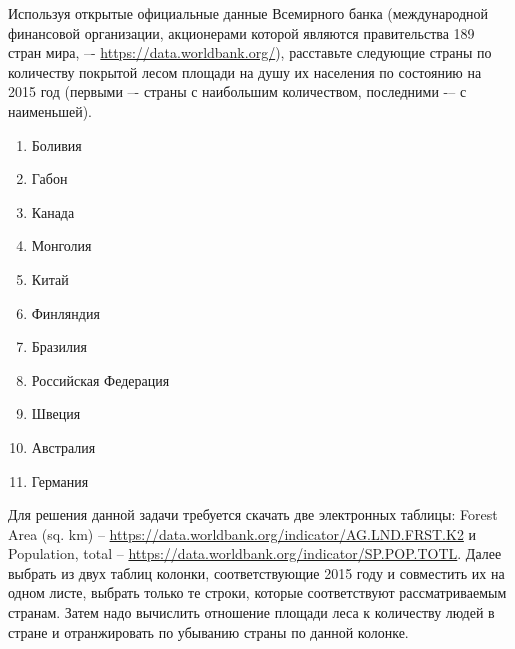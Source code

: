 
Используя открытые официальные данные Всемирного банка (международной финансовой организации, акционерами которой являются правительства 189 стран мира, –- \url{https://data.worldbank.org/}), расставьте следующие страны по количеству покрытой лесом площади на душу их населения по состоянию на 2015 год (первыми –- страны с наибольшим количеством, последними -– с наименьшей).

\begin{enumerate}
    \item Боливия
    \item Габон
    \item Канада
    \item Монголия
    \item Китай
    \item Финляндия
    \item Бразилия
    \item Российская Федерация
    \item Швеция
    \item Австралия
    \item Германия
\end{enumerate}

\solutionSection
Для решения данной задачи требуется скачать две электронных таблицы: Forest Area (sq. km) -- \url{https://data.worldbank.org/indicator/AG.LND.FRST.K2} и Population, total -- \url{https://data.worldbank.org/indicator/SP.POP.TOTL}. Далее выбрать из двух таблиц колонки, соответствующие 2015 году и совместить их на одном листе, выбрать только те строки, которые соответствуют рассматриваемым странам. Затем надо вычислить отношение площади леса к количеству людей в стране и отранжировать по убыванию страны по данной колонке.

